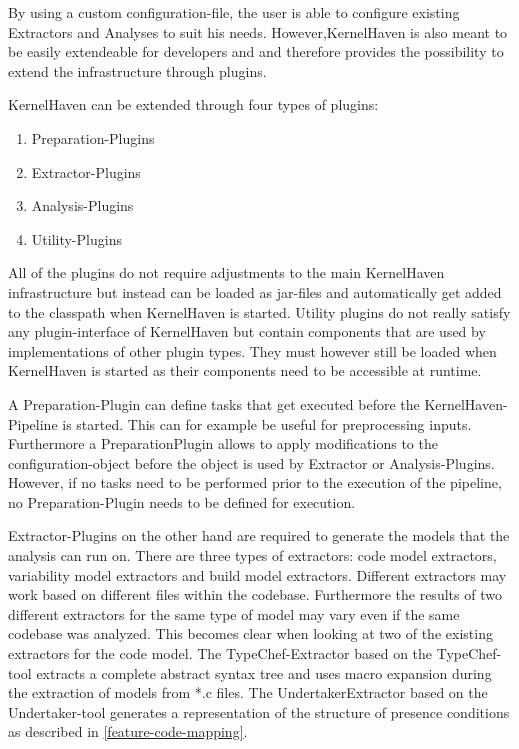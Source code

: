 \documentclass[a4paper]{article}
\begin{document}
By using a custom configuration-file, the user is able to configure existing Extractors and Analyses to suit his needs. However,KernelHaven is also meant to be easily extendeable for developers and and therefore provides the possibility to extend the infrastructure through plugins.

KernelHaven can be extended through four types of plugins:

\begin{enumerate}
    \item Preparation-Plugins
	\item Extractor-Plugins
	\item Analysis-Plugins
	\item Utility-Plugins
\end{enumerate}

All of the plugins do not require adjustments to the main KernelHaven infrastructure but instead can be loaded as jar-files and automatically get added to the classpath when KernelHaven is started. Utility plugins do not really satisfy any plugin-interface of KernelHaven but contain components that are used by implementations of other plugin types. They must however still be loaded when KernelHaven is started as their components need to be accessible at runtime.

A Preparation-Plugin can define tasks that get executed before the KernelHaven-Pipeline is started. This can for example be useful for preprocessing inputs. Furthermore a PreparationPlugin allows to apply modifications to the configuration-object before the object is used by Extractor or Analysis-Plugins. However, if no tasks need to be performed prior to the execution of the pipeline, no Preparation-Plugin needs to be defined for execution. 

Extractor-Plugins on the other hand are required to generate the models that the analysis can run on. There are three types of extractors: code model extractors, variability model extractors and build model extractors. Different extractors may work based on different files within the codebase. Furthermore the results of two different extractors for the same type of model may vary even if the same codebase was analyzed. This becomes clear when looking at two of the existing extractors for the code model. The TypeChef-Extractor based on the TypeChef-tool \cite{Kenner:2010:TTT:1868688.1868693} extracts a complete abstract syntax tree and uses macro expansion during the extraction of models from *.c files. The UndertakerExtractor based on the Undertaker-tool \cite{Tartler:2011:FCC:1966445.1966451} generates a representation of the structure of presence conditions as described in \autoref{feature-code-mapping}.
\end{document}
